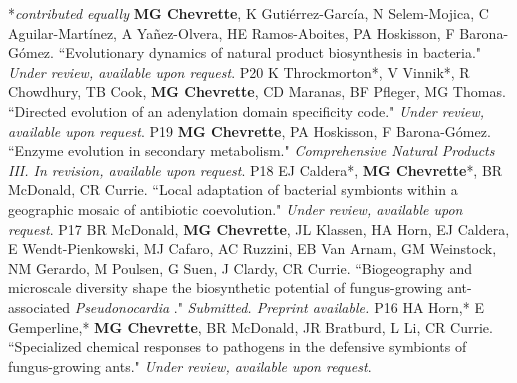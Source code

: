 


\begin{cvpubs}
   \cvpub
    {\hspace{-1cm} *\textit{contributed equally}} %
    {} %
   \cvpub
    {\textbf{MG Chevrette}, K Guti\'{e}rrez-Garc\'{i}a, N Selem-Mojica, C Aguilar-Martínez, A Ya\~{n}ez-Olvera, HE Ramos-Aboites, PA Hoskisson, F Barona-G\'{o}mez. ``Evolutionary dynamics of natural product biosynthesis in bacteria." \textit{Under review, available upon request}.
    } %
    {P20}
   \cvpub
    {K Throckmorton*, V Vinnik*, R Chowdhury, TB Cook, \textbf{MG Chevrette}, CD Maranas, BF Pfleger, MG Thomas. ``Directed evolution of an adenylation domain specificity code." \textit{Under review, available upon request}.
    } %
    {P19}
   \cvpub
    {\textbf{MG Chevrette}, PA Hoskisson, F Barona-G\'{o}mez. ``Enzyme evolution in secondary metabolism." \textit{Comprehensive Natural Products III. In revision, available upon request}.
    } %
    {P18}
   \cvpub
    {EJ Caldera*, \textbf{MG Chevrette}*, BR McDonald, CR Currie. ``Local adaptation of bacterial symbionts within a geographic mosaic of antibiotic coevolution." \textit{Under review, available upon request}.
    } %
    {P17}
   \cvpub
    {BR McDonald, \textbf{MG Chevrette}, JL Klassen, HA Horn, EJ Caldera, E Wendt-Pienkowski, MJ Cafaro, AC Ruzzini, EB Van Arnam, GM Weinstock, NM Gerardo, M Poulsen, G Suen, J Clardy, CR Currie. ``Biogeography and microscale diversity shape the biosynthetic potential of fungus-growing ant-associated \textit{Pseudonocardia}
." \textit{Submitted. Preprint available. \textbf{}}
    } %
    {P16} %
  \cvpub
    {HA Horn,* E Gemperline,* \textbf{MG Chevrette}, BR McDonald, JR Bratburd, L Li, CR Currie. ``Specialized chemical responses to pathogens in the defensive symbionts of fungus-growing ants." \textit{Under review, available upon request}.
}
\end{cvpubs}

